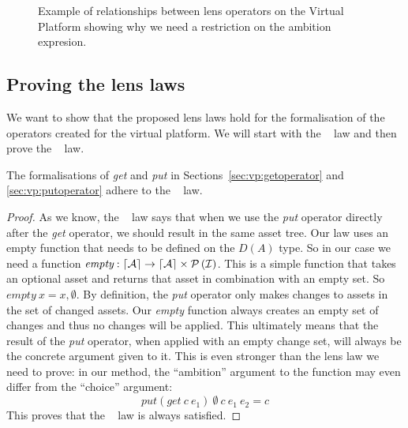 \begin{figure}
{
  }%
  \caption{Example of relationships between lens operators on the Virtual Platform showing why we need a restriction on the ambition expresion.}
  \label{fig:operator:vp:example}
\end{figure}

\subsection*{Proving the lens laws}
We want to show that the proposed lens laws hold for the formalisation of the
operators created for the virtual platform. We will start with the \getput~ law
and then prove the \putget~ law.

\begin{theorem}
  The formalisations of \emph{get} and \emph{put} in Sections~\ref{sec:vp:getoperator}
  and \ref{sec:vp:putoperator} adhere to the \getput~ law.
\end{theorem}

\begin{proof}
  As we know, the \getput~ law says that when we use the \emph{put} operator
  directly after the \emph{get} operator, we should result in the same asset
  tree. Our law uses an empty function that needs to be defined on the $D(A)$
  type. So in our case we need a function
  \(\textit{empty} : \lceil \mathcal{A} \rceil \rightarrow \lceil \mathcal{A} \rceil \times \mathcal{P} \left(\mathcal{I}\right)\).
  This is a simple function that takes an optional asset and returns that asset
  in combination with an empty set. So \(\textit{empty}~x = x, \emptyset\).
  By definition, the \emph{put} operator only makes changes to assets in the
  set of changed assets. Our \emph{empty} function always creates an empty set of
  changes and thus no changes will be applied. This ultimately means that the
  result of the \emph{put} operator, when applied with an empty change set, will
  always be the concrete argument given to it. This is even stronger than the
  lens law we need to prove: in our method, the ``ambition'' argument to the function
  may even differ from the ``choice'' argument:
  \[
    \mathit{put}\left(\mathit{get}~c~e_1\right)~\emptyset~c~e_1~e_2 = c
  \]
  This proves that the \getput~ law is always satisfied.
\end{proof}

